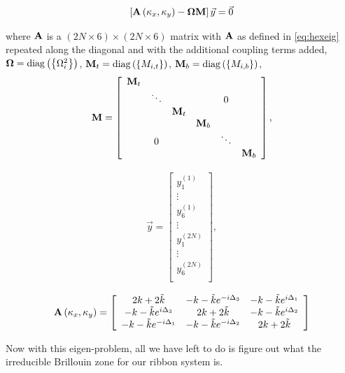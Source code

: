 \begin{align}
  \left[\mathbf{A}\left(\kappa_{x},\kappa_{y}\right)-\mathbf{\Omega}\mathbf{M}\right]\vec{y}=\vec{0}
\label{eq:hexstripeig}
\end{align}

where $\mathbf{A}$ is a $(2N \times 6) \times (2N \times 6)$ matrix with
$\mathbf{A}$ as defined in \eqref{eq:hexeig} repeated along the diagonal and with
the additional coupling terms added,
$\mathbf{\Omega}=\operatorname{diag}\left(\left\{\Omega_i^2\right\}\right)$,
$\mathbf{M}_{t}=\operatorname{diag}\left(\left\{M_{i,t}\right\}\right)$,
$\mathbf{M}_{b}=\operatorname{diag}\left(\left\{M_{i,b}\right\}\right)$,
\begin{align}
\mathbf{M}=\left[
\begin{array}{cccccc}
\mathbf{M}_{t}\\
 & \ddots &  &  & 0\\
 &  & \mathbf{M}_{t}\\
 &  &  & \mathbf{M}_{b}\\
 & 0 &  &  & \ddots\\
 &  &  &  &  & \mathbf{M}_{b}
\end{array}\right],
\end{align}

\begin{align}
\vec{y}=\left[
\begin{array}{c}
y_1^{(1)}\\
\vdots\\
y_6^{(1)}\\
\vdots\\
y_1^{(2N)}\\
\vdots\\
y_6^{(2N)}\\
\end{array}\right],
\end{align}

\begin{align}
  \mathbf{A}\left(\kappa_{x},\kappa_{y}\right)=\left[
\begin{array}{ccc}
2k+2\tilde{k} & -k-\tilde{k}e^{-i\Delta_3} & -k-\tilde{k}e^{i\Delta_1} \\
-k-\tilde{k}e^{i\Delta_3} & 2k+2\tilde{k} & -k-\tilde{k}e^{i\Delta_2} \\
-k-\tilde{k}e^{-i\Delta_1} & -k-\tilde{k}e^{-i\Delta_2} & 2k+2\tilde{k} 
\end{array}\right]
\end{align}

Now with this eigen-problem, all we have left to do is figure out what the
irreducible Brillouin zone for our ribbon system is.

